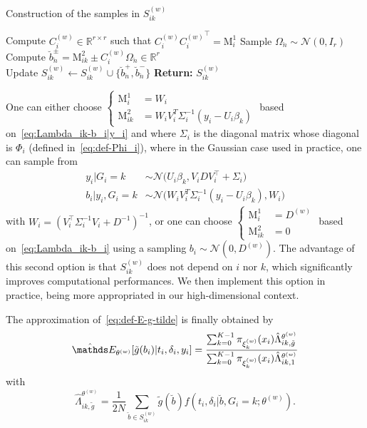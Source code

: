 \documentclass[11pt]{article}
\newcommand{\cN}{\mathcal N}
\newcommand{\R}{\mathds R}
\newcommand{\E}{\mathds E}
\begin{document}
\vspace{.5cm}

\begin{algorithm}[H]
\DontPrintSemicolon
\caption{Construction of the samples in $S_{ik}^{(w)}$}
\label{alg:construct-set-S}
Compute $C_i^{(w)} \in \R^{r \times r}$ such that 
$C_i^{(w)}{C_i^{(w)}}^\top = \text{M}_i^1$  \nonumber
{}    
{ 
  Sample $\Omega_{\breve{n}} \sim \cN(0, I_r)$ \\
  Compute $\breve{b}_{\breve{n}}^\pm = \text{M}_{ik}^2 \pm C_i^{(w)} \Omega_{\breve{n}} \in \R^r$ \\
  Update $S_{ik}^{(w)} \leftarrow S_{ik}^{(w)} \cup \{\breve{b}_{\breve{n}}^+, \breve{b}_{\breve{n}}^- \}$
}
\textbf{Return:} {$S_{ik}^{(w)}$}
\end{algorithm}

\vspace{.5cm}

\noindent One can either choose $\left\{ \begin{array}{ll} \text{M}_i^1 &= W_i \\ \text{M}_{ik}^2 &= W_iV_i^T\Sigma_i^{-1}(y_i - U_i\beta_k) \end{array} \right.$ based on~\eqref{eq:Lambda_ik-b_i|y_i} and where $\Sigma_i$ is the diagonal matrix whose diagonal is $\Phi_i$ (defined in~\eqref{eq:def-Phi_i}), where in the Gaussian case used in practice, one can sample from
\begin{align*}
  y_i | G_i = k &\sim \cN\big(U_i\beta_k, V_iDV_i^\top + \Sigma_i\big) \\
  b_i | y_i, G_i=k &\sim \cN \big(W_iV_i^T\Sigma_i^{-1}(y_i - U_i\beta_k), W_i\big)  
\end{align*}
with $W_i = (V_i^\top\Sigma_i^{-1}V_i + D^{-1})^{-1}$, or one can choose $\left\{ \begin{array}{ll} \text{M}_i^1 &= D^{(w)} \\ \text{M}_{ik}^2 &= 0 \end{array} \right.$ based on~\eqref{eq:Lambda_ik-b_i} using a sampling $b_i \sim \cN(0, D^{(w)})$. The advantage of this second option is that $S_{ik}^{(w)}$ does not depend on $i$ nor $k$, which significantly improves computational performances. We then implement this option in practice, being more appropriated in our high-dimensional context.

The approximation of~\eqref{eq:def-E-g-tilde} is finally obtained by
\begin{equation}
  \label{eq:def-hat-E-g-tilde}
  \hat \E_{\theta^{(w)}}[ \tilde g(b_i) | t_i, \delta_i, y_i] = \dfrac{ \sum_{k=0}^{K-1} \pi_{\xi_k^{(w)}}(x_i) \hat \Lambda_{ik,\tilde g}^{\theta^{(w)}}}{\sum_{k=0}^{K-1} \pi_{\xi_k^{(w)}}(x_i) \hat \Lambda_{ik,1}^{\theta^{(w)}}}
\end{equation}
with
\begin{equation}
  \label{eq:hat_Lambda_ik}
  \hat \Lambda_{ik,\tilde g}^{\theta^{(w)}} = \dfrac{1}{2N} \sum_{\breve{b} \in S_{ik}^{(w)}} \tilde g(\breve{b}) f(t_i, \delta_i | \breve{b}, G_i = k ; \theta^{(w)}).
\end{equation}
\end{document}
